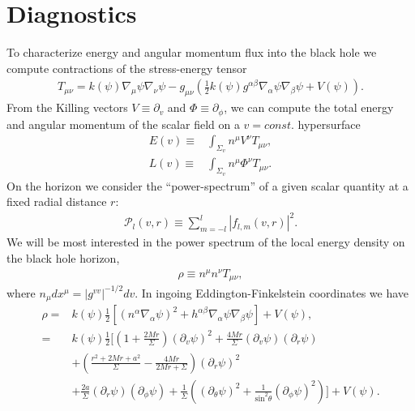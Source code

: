 \documentclass[%
 prd,
amsmath,amssymb,
preprint,%
]{revtex4-1}
\begin{document}
\section{\label{sec:diagnostics}
   Diagnostics
   }
To characterize energy and angular momentum flux into the black hole
we compute contractions of the stress-energy tensor
\begin{align}
   T_{\mu\nu}
   =
   k\left(\psi\right)
   \nabla_{\mu}\psi\nabla_{\nu}\psi
   -
   g_{\mu\nu}
   \left(
      \frac{1}{2}k\left(\psi\right)
      g^{\alpha\beta}\nabla_{\alpha}\psi\nabla_{\beta}\psi
      +
      V\left(\psi\right)
   \right)
   .
\end{align}
From the Killing vectors $V\equiv\partial_v$ and $\Phi\equiv\partial_{\phi}$,
we can compute the total energy and angular momentum of the scalar field on
a $v=const.$ hypersurface
\begin{subequations}
   \begin{align}
      E(v)
      \equiv&
      \int_{\Sigma_v}n^{\mu}V^{\nu}T_{\mu\nu}
      ,\\
      L(v)
      \equiv&
      \int_{\Sigma_v}n^{\mu}\Phi^{\nu}T_{\mu\nu}
      .
   \end{align}
\end{subequations}
On the horizon we consider the ``power-spectrum'' of a given scalar quantity
at a fixed radial distance $r$:
\begin{align}
   \mathcal{P}_l\left(v,r\right)
   \equiv
   \sum_{m=-l}^l \left|f_{l,m}\left(v,r\right)\right|^2
   .
\end{align}
We will be most interested in the power spectrum of the local energy density
on the black hole horizon, 
\begin{align}
   \rho
   \equiv
   n^{\mu}n^{\nu}T_{\mu\nu}
   ,
\end{align}
where $n_{\mu}dx^{\mu}=\left|g^{vv}\right|^{-1/2}dv$.
In ingoing Eddington-Finkelstein coordinates we have
\begin{align}
   \rho
   =&
   k\left(\psi\right)
   \frac{1}{2}
   \left[
      \left(n^{\alpha}\nabla_{\alpha}\psi\right)^2
      +
      h^{\alpha\beta}\nabla_{\alpha}\psi\nabla_{\beta}\psi
   \right]
   +
   V\left(\psi\right)
   ,\nonumber\\
   =&
   k\left(\psi\right)
   \frac{1}{2}\Bigg[
      \left(1+\frac{2Mr}{\Sigma}\right)
      \left(\partial_v\psi\right)^2
      +
      \frac{4Mr}{\Sigma}
      \left(\partial_v\psi\right)\left(\partial_r\psi\right)
      \nonumber\\&
      +
      \left(
         \frac{r^2+2Mr+a^2}{\Sigma}
         -
         \frac{4Mr}{2Mr+\Sigma}
      \right)
      \left(\partial_r\psi\right)^2
      \nonumber\\&
      +
      \frac{2a}{\Sigma}
      \left(\partial_r\psi\right)
      \left(\partial_{\phi}\psi\right)
      +
      \frac{1}{\Sigma}
      \left(
         \left(\partial_{\theta}\psi\right)^2
         +
         \frac{1}{\mathrm{sin}^2\theta}
         \left(\partial_{\phi}\psi\right)^2
      \right)
   \Bigg]
   +
   V\left(\psi\right)
   .
\end{align}
\appendix
\end{document}
